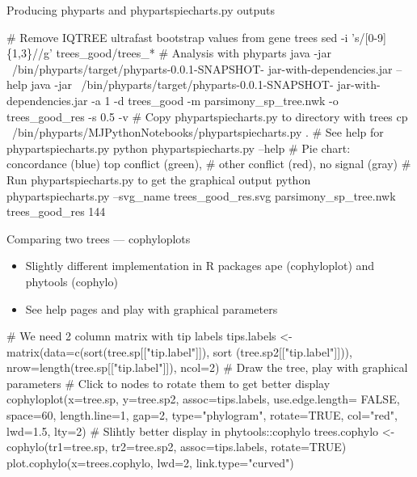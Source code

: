 \documentclass[compress, ucs, xelatex, 11pt, xcolor=x11names, aspectratio=169,
	hyperref={
		bookmarks=true,
		unicode=true,
		colorlinks=true,
		pdftitle={HybSeq course},
		plainpages=false,
		pdfauthor={Vojtech Zeisek},
		pdfsubject={Practical processing of HybSeq target enrichment sequencing data on computing grids like MetaCentrum},
		pdfcreator={XeLaTeX},
		pdfkeywords={BASH, command line, GNU, HybSeq, Linux, MetaCentrum, sequencing shell, target enrichment},
		linkcolor=Cyan2, %
		anchorcolor=Firebrick2, %
		citecolor=Firebrick2, %
		filecolor=Firebrick2, %
		menucolor=Firebrick2, %
		urlcolor=Chartreuse2, %
		pdftex},
	url={hyphens, lowtilde} %
	]{beamer}
\renewcommand{\texttt}[1]{\colorbox{Snow4}{{\ttfamily #1}}}
\begin{document}
\begin{frame}[fragile]{Producing phyparts and phypartspiecharts.py outputs}
	\begin{bashcode}
    # Remove IQTREE ultrafast bootstrap values from gene trees
    sed -i 's/\/[0-9]\{1,3\}//g' trees_good/trees_*
    # Analysis with phyparts
    java -jar ~/bin/phyparts/target/phyparts-0.0.1-SNAPSHOT-
      jar-with-dependencies.jar --help
    java -jar ~/bin/phyparts/target/phyparts-0.0.1-SNAPSHOT-
      jar-with-dependencies.jar -a 1 -d trees_good -m
      parsimony_sp_tree.nwk -o trees_good_res -s 0.5 -v
    # Copy phypartspiecharts.py to directory with trees
    cp ~/bin/phyparts/MJPythonNotebooks/phypartspiecharts.py .
    # See help for phypartspiecharts.py
    python phypartspiecharts.py --help
    # Pie chart: concordance (blue) top conflict (green),
    # other conflict (red), no signal (gray)
    # Run phypartspiecharts.py to get the graphical output
    python phypartspiecharts.py --svg_name trees_good_res.svg
      parsimony_sp_tree.nwk trees_good_res 144
	\end{bashcode}
\end{frame}

\begin{frame}[fragile]{Comparing two trees --- cophyloplots}
	\begin{itemize}
		\item Slightly different implementation in \texttt{R} packages \texttt{ape} (\texttt{cophyloplot}) and \texttt{phytools} (\texttt{cophylo})
		\item See help pages and play with graphical parameters
	\end{itemize}
	\begin{spluscode}
    # We need 2 column matrix with tip labels
    tips.labels <- matrix(data=c(sort(tree.sp[["tip.label"]]), sort
      (tree.sp2[["tip.label"]])), nrow=length(tree.sp[["tip.label"]]), ncol=2)
    # Draw the tree, play with graphical parameters
    # Click to nodes to rotate them to get better display
    cophyloplot(x=tree.sp, y=tree.sp2, assoc=tips.labels, use.edge.length=
      FALSE, space=60, length.line=1, gap=2, type="phylogram", rotate=TRUE,
      col="red", lwd=1.5, lty=2)
    # Slihtly better display in phytools::cophylo
    trees.cophylo <- cophylo(tr1=tree.sp, tr2=tree.sp2, assoc=tips.labels,
      rotate=TRUE)
    plot.cophylo(x=trees.cophylo, lwd=2, link.type="curved")
	\end{spluscode}
\end{frame}
\end{document}
